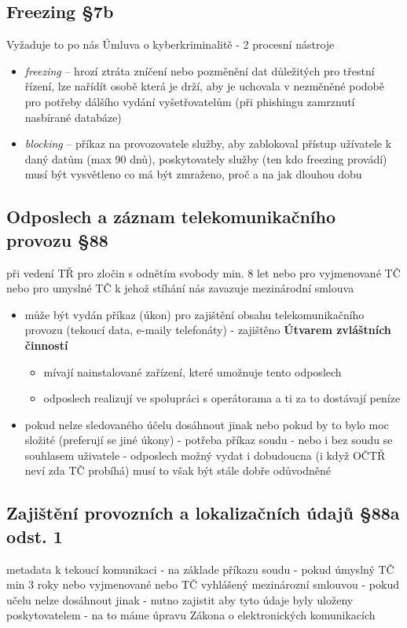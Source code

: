 \subsection{Freezing §7b}
Vyžaduje to po nás Úmluva o kyberkriminalitě - 2 procesní nástroje
\begin{itemize}
    \item \textit{freezing} -- hrozí ztráta zníčení nebo pozměnění dat důležitých pro třestní řízení, lze nařídít osobě která je drží, aby je uchovala v nezměněné podobě pro potřeby dálšího vydání vyšetřovatelům (při phishingu zamrznutí nasbírané databáze)
    \item \textit{blocking} -- příkaz na provozovatele služby, aby zablokoval přístup užívatele k daný datům (max 90 dnů), poskytovately služby (ten kdo freezing provádí) musí být vysvětleno co má být zmraženo, proč a na jak dlouhou dobu
\end{itemize}

\subsection{Odposlech a záznam telekomunikačního provozu §88}
při vedení TŘ pro zločin s odnětím svobody min. 8 let nebo pro vyjmenované TČ nebo pro
umyslné TČ k jehož stíhání nás zavazuje mezinárodní smlouva
\begin{itemize}
    \item může být vydán příkaz (úkon) pro zajištění obsahu telekomunikačního provozu (tekoucí data, e-maily telefonáty) - zajištěno \textbf{Útvarem zvláštních činností} 
    \begin{itemize}
        \item mívají nainstalované zařízení, které umožnuje tento odposlech
        \item odposlech realizují ve spolupráci s operátorama a ti za to dostávají peníze
    \end{itemize}
    \item pokud nelze sledovaného účelu dosáhnout jinak nebo pokud by to bylo moc složité (preferují se
jiné úkony) - potřeba příkaz soudu - nebo i bez soudu se souhlasem uživatele - odposlech možný
vydat i dobudoucna (i když OČTŘ neví zda TČ probíhá) musí to však být stále dobře odůvodněné
\end{itemize}

\subsection{Zajištění provozních a lokalizačních údajů §88a odst. 1}
metadata k tekoucí komunikaci - na základe příkazu soudu - pokud úmyslný TČ min 3 roky nebo
vyjmenované nebo TČ vyhlášený mezinározní smlouvou - pokud učelu nelze dosáhnout jinak -
nutno zajistit aby tyto údaje byly uloženy poskytovatelem - na to máme úpravu Zákona o
elektronických komunikacích

